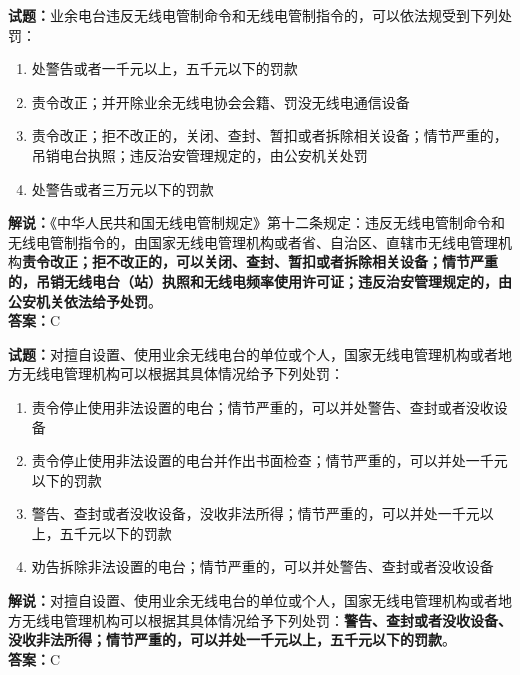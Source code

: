 \documentclass{ctexbook}
\begin{document}
\bigskip


\noindent\textbf{试题：}业余电台违反无线电管制命令和无线电管制指令的，可以依法规受到下列处罚：
\begin{enumerate}[leftmargin=3em]
	\item  处警告或者一千元以上，五千元以下的罚款
	\item  责令改正；并开除业余无线电协会会籍、罚没无线电通信设备
	\item  责令改正；拒不改正的，关闭、查封、暂扣或者拆除相关设备；情节严重的，吊销电台执照；违反治安管理规定的，由公安机关处罚
	\item  处警告或者三万元以下的罚款
\end{enumerate}
\noindent\textbf{解说：}《中华人民共和国无线电管制规定》第十二条规定：违反无线电管制命令和无线电管制指令的，由国家无线电管理机构或者省、自治区、直辖市无线电管理机构\textbf{责令改正；拒不改正的，可以关闭、查封、暂扣或者拆除相关设备；情节严重的，吊销无线电台（站）执照和无线电频率使用许可证；违反治安管理规定的，由公安机关依法给予处罚}。\\\noindent\textbf{答案：}C





\noindent\textbf{试题：}对擅自设置、使用业余无线电台的单位或个人，国家无线电管理机构或者地方无线电管理机构可以根据其具体情况给予下列处罚：
\begin{enumerate}[leftmargin=3em]
	\item  责令停止使用非法设置的电台；情节严重的，可以并处警告、查封或者没收设备
	\item  责令停止使用非法设置的电台并作出书面检查；情节严重的，可以并处一千元以下的罚款
	\item  警告、查封或者没收设备，没收非法所得；情节严重的，可以并处一千元以上，五千元以下的罚款
	\item  劝告拆除非法设置的电台；情节严重的，可以并处警告、查封或者没收设备
\end{enumerate}
\noindent\textbf{解说：}对擅自设置、使用业余无线电台的单位或个人，国家无线电管理机构或者地方无线电管理机构可以根据其具体情况给予下列处罚：\textbf{警告、查封或者没收设备、没收非法所得；情节严重的，可以并处一千元以上，五千元以下的罚款}。\\\textbf{答案：}C



\bigskip
\end{document}
